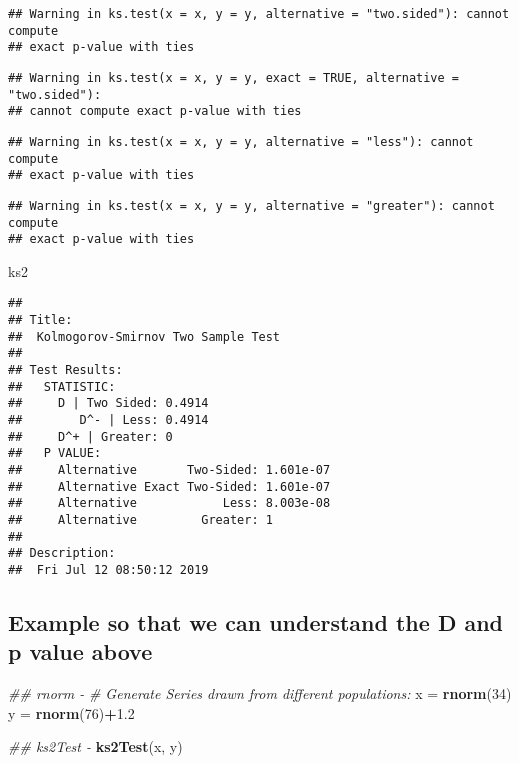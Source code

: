 \documentclass[]{article}
\newenvironment{Shaded}{\begin{snugshade}}{\end{snugshade}}
\newcommand{\CommentTok}[1]{\textcolor[rgb]{0.56,0.35,0.01}{\textit{#1}}}
\newcommand{\DecValTok}[1]{\textcolor[rgb]{0.00,0.00,0.81}{#1}}
\newcommand{\FloatTok}[1]{\textcolor[rgb]{0.00,0.00,0.81}{#1}}
\newcommand{\KeywordTok}[1]{\textcolor[rgb]{0.13,0.29,0.53}{\textbf{#1}}}
\newcommand{\NormalTok}[1]{#1}
\newcommand{\OperatorTok}[1]{\textcolor[rgb]{0.81,0.36,0.00}{\textbf{#1}}}
\newcommand{\StringTok}[1]{\textcolor[rgb]{0.31,0.60,0.02}{#1}}
\begin{document}
\begin{verbatim}
## Warning in ks.test(x = x, y = y, alternative = "two.sided"): cannot compute
## exact p-value with ties
\end{verbatim}

\begin{verbatim}
## Warning in ks.test(x = x, y = y, exact = TRUE, alternative = "two.sided"):
## cannot compute exact p-value with ties
\end{verbatim}

\begin{verbatim}
## Warning in ks.test(x = x, y = y, alternative = "less"): cannot compute
## exact p-value with ties
\end{verbatim}

\begin{verbatim}
## Warning in ks.test(x = x, y = y, alternative = "greater"): cannot compute
## exact p-value with ties
\end{verbatim}

\begin{Shaded}
\begin{Highlighting}[]
\NormalTok{ks2}
\end{Highlighting}
\end{Shaded}

\begin{verbatim}
## 
## Title:
##  Kolmogorov-Smirnov Two Sample Test
## 
## Test Results:
##   STATISTIC:
##     D | Two Sided: 0.4914
##        D^- | Less: 0.4914
##     D^+ | Greater: 0
##   P VALUE:
##     Alternative       Two-Sided: 1.601e-07 
##     Alternative Exact Two-Sided: 1.601e-07 
##     Alternative            Less: 8.003e-08 
##     Alternative         Greater: 1 
## 
## Description:
##  Fri Jul 12 08:50:12 2019
\end{verbatim}

\hypertarget{example-so-that-we-can-understand-the-d-and-p-value-above}{%
\subsection{Example so that we can understand the D and p value
above}\label{example-so-that-we-can-understand-the-d-and-p-value-above}}

\begin{Shaded}
\begin{Highlighting}[]
\CommentTok{## rnorm - }
   \CommentTok{# Generate Series drawn from different populations:}
\NormalTok{   x =}\StringTok{ }\KeywordTok{rnorm}\NormalTok{(}\DecValTok{34}\NormalTok{)}
\NormalTok{   y =}\StringTok{ }\KeywordTok{rnorm}\NormalTok{(}\DecValTok{76}\NormalTok{)}\OperatorTok{+}\FloatTok{1.2}
  
\CommentTok{## ks2Test - }
   \KeywordTok{ks2Test}\NormalTok{(x, y)}
\end{Highlighting}
\end{Shaded}
\end{document}
